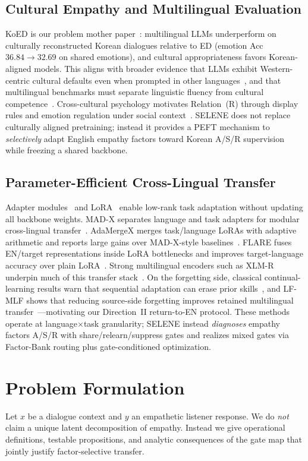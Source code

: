 \documentclass[journal]{IEEEtran}
\begin{document}
\subsection{Cultural Empathy and Multilingual Evaluation}
KoED is our problem mother paper~\cite{lee2025koed}: multilingual LLMs underperform on culturally reconstructed Korean dialogues relative to ED (emotion Acc $36.84\!\rightarrow\!32.69$ on shared emotions), and cultural appropriateness favors Korean-aligned models.
This aligns with broader evidence that LLMs exhibit Western-centric cultural defaults even when prompted in other languages~\cite{zhou2024culture}, and that multilingual benchmarks must separate linguistic fluency from cultural competence~\cite{ahuja2023mega,ponti2020xcopa}.
Cross-cultural psychology motivates Relation~(R) through display rules and emotion regulation under social context~\cite{matsumoto2008culture}.
SELENE does not replace culturally aligned pretraining; instead it provides a PEFT mechanism to \emph{selectively} adapt English empathy factors toward Korean A/S/R supervision while freezing a shared backbone.

\subsection{Parameter-Efficient Cross-Lingual Transfer}
Adapter modules~\cite{houlsby2019adapters} and LoRA~\cite{hu2022lora} enable low-rank task adaptation without updating all backbone weights.
MAD-X separates language and task adapters for modular cross-lingual transfer~\cite{pfeiffer2020madx}.
AdaMergeX merges task/language LoRAs with adaptive arithmetic and reports large gains over MAD-X-style baselines~\cite{zhao2025adamerge}.
FLARE fuses EN/target representations inside LoRA bottlenecks and improves target-language accuracy over plain LoRA~\cite{borchert2025flare}.
Strong multilingual encoders such as XLM-R underpin much of this transfer stack~\cite{conneau2020xlmr}.
On the forgetting side, classical continual-learning results warn that sequential adaptation can erase prior skills~\cite{kirkpatrick2017overcoming}, and LF-MLF shows that reducing source-side forgetting improves retained multilingual transfer~\cite{wang2022lfmlf}---motivating our Direction~II return-to-EN protocol.
These methods operate at language$\times$task granularity; SELENE instead \emph{diagnoses} empathy factors A/S/R with share/relearn/suppress gates and realizes mixed gates via Factor-Bank routing plus gate-conditioned optimization.

\section{Problem Formulation}
Let $x$ be a dialogue context and $y$ an empathetic listener response.
We do \emph{not} claim a unique latent decomposition of empathy.
Instead we give operational definitions, testable propositions, and analytic consequences of the gate map that jointly justify factor-selective transfer.
\end{document}

